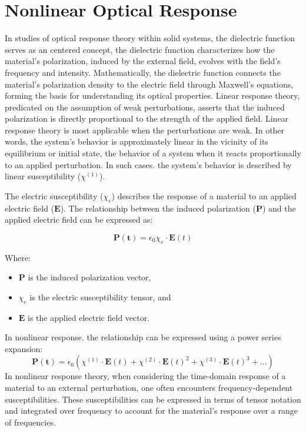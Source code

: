 \section{Nonlinear Optical Response}
In studies of optical response theory within solid systems, the dielectric function serves as an centered concept, the dielectric function characterizes how the material's polarization, induced by the external field, evolves with the field's frequency and intensity. Mathematically, the dielectric function connects the material's polarization density to the electric field through Maxwell's equations, forming the basis for understanding its optical properties. Linear response theory, predicated on the assumption of weak perturbations, asserts that the induced polarization is directly proportional to the strength of the applied field.
Linear response theory is most applicable when the perturbations are weak. In other words, the system's behavior is approximately linear in the vicinity of its equilibrium or initial state, the behavior of a system when it reacts proportionally to an applied perturbation.
In such cases. the system's behavior is described by linear susceptibility ($\chi^{(1)}$).

The electric susceptibility ($\chi_e$) describes the response of a material to an applied electric field ($\mathbf{E}$). The relationship between the induced polarization ($\mathbf{P}$) and the applied electric field can be expressed as:

\[
	\mathbf{P(t)} =\epsilon_0 \chi_e \cdot \mathbf{E}(t)
\]

Where:
\begin{itemize}
	\item $\mathbf{P}$ is the induced polarization vector,
	\item $\chi_e$ is the electric susceptibility tensor, and
	\item $\mathbf{E}$ is the applied electric field vector.
\end{itemize}

In nonlinear response. the relationship can be expressed using a power series expansion:
\[
	\mathbf{P(t)} =\epsilon_0( \chi^{(1)} \cdot \mathbf{E}(t)+\chi^{(2)} \cdot \mathbf{E}(t)^2 + \chi^{(3)}
	\cdot \mathbf{E}(t)^3 + ...)
\]
In nonlinear response theory, when considering the time-domain response of a material to an external perturbation, one often encounters frequency-dependent susceptibilities. These susceptibilities can be expressed in terms of tensor notation and integrated over frequency to account for the material's response over a range of frequencies.

